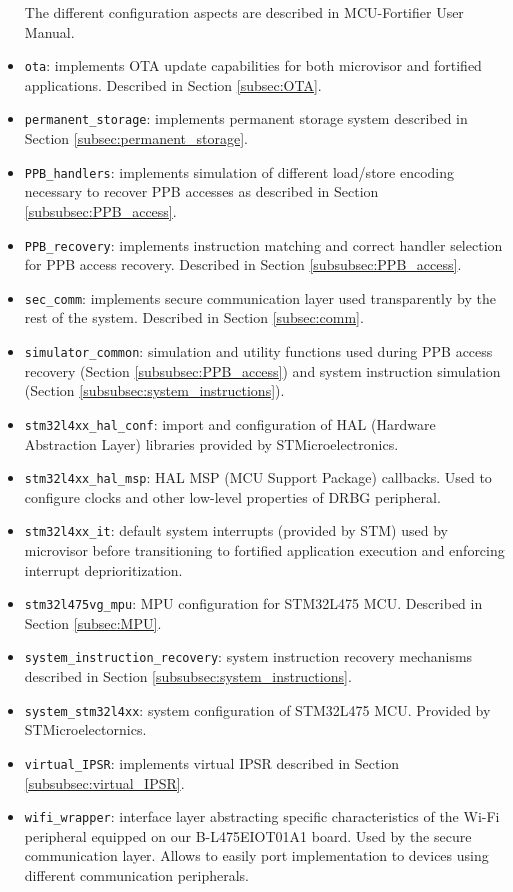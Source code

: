 \documentclass{article}
\begin{document}
\begin{itemize}
	The different configuration aspects are described in MCU-Fortifier User Manual\cite{user_manual}.
	\item \verb|ota|: implements OTA update capabilities for both microvisor and fortified applications. Described in Section \ref{subsec:OTA}.
	\item \verb|permanent_storage|: implements permanent storage system described in Section \ref{subsec:permanent_storage}.
	\item \verb|PPB_handlers|: implements simulation of different load/store encoding necessary to recover PPB accesses as described in Section \ref{subsubsec:PPB_access}.
	\item \verb|PPB_recovery|: implements instruction matching and correct handler selection for PPB access recovery. Described in Section \ref{subsubsec:PPB_access}.
	\item \verb|sec_comm|: implements secure communication layer used transparently by the rest of the system. Described in Section \ref{subsec:comm}.
	\item \verb|simulator_common|: simulation and utility functions used during PPB access recovery (Section \ref{subsubsec:PPB_access}) and system instruction simulation (Section \ref{subsubsec:system_instructions}).
	\item \verb|stm32l4xx_hal_conf|: import and configuration of HAL (Hardware Abstraction Layer) libraries provided by STMicroelectronics.
	\item \verb|stm32l4xx_hal_msp|: HAL MSP (MCU Support Package) callbacks. Used to configure clocks and other low-level properties of DRBG peripheral.
	\item \verb|stm32l4xx_it|: default system interrupts (provided by STM) used by microvisor before transitioning to fortified application execution and enforcing interrupt deprioritization.
	\item \verb|stm32l475vg_mpu|: MPU configuration for STM32L475 MCU. Described in Section \ref{subsec:MPU}.
	\item \verb|system_instruction_recovery|: system instruction recovery mechanisms described in Section \ref{subsubsec:system_instructions}.
	\item \verb|system_stm32l4xx|: system configuration of STM32L475 MCU. Provided by STMicroelectornics.
	\item \verb|virtual_IPSR|: implements virtual IPSR described in Section \ref{subsubsec:virtual_IPSR}.
	\item \verb|wifi_wrapper|: interface layer abstracting specific characteristics of the Wi-Fi peripheral equipped on our B-L475EIOT01A1 board. Used by the secure communication layer. Allows to easily port implementation to devices using different communication peripherals.
\end{itemize}
\end{document}
